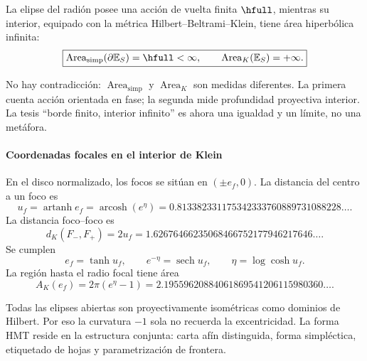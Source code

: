 \begin{theorem}
La elipse del radión posee una acción de vuelta finita \(\hfull\), mientras
su interior, equipado con la métrica Hilbert--Beltrami--Klein, tiene área
hiperbólica infinita:
\begin{equation}
\boxed{
\operatorname{Area}_{\mathrm{simp}}(\partial\mathbb E_S)=\hfull<\infty,
\qquad
\operatorname{Area}_{K}(\mathbb E_S)=+\infty.}
\label{eq:finite-infinite}
\end{equation}
\end{theorem}

No hay contradicción: \(\operatorname{Area}_{\mathrm{simp}}\) y
\(\operatorname{Area}_K\) son medidas diferentes. La primera cuenta acción
orientada en fase; la segunda mide profundidad proyectiva interior. La tesis
\enquote{borde finito, interior infinito} es ahora una igualdad y un límite,
no una metáfora.

\paragraph{Coordenadas focales en el interior de Klein}

En el disco normalizado, los focos se sitúan en \((\pm e_f,0)\). La distancia
del centro a un foco es
\begin{equation}
u_f=\operatorname{artanh}e_f
=\operatorname{arcosh}(e^\eta)
=0.813382331175342333760889731088228\ldots.
\label{eq:klein-focal}
\end{equation}
La distancia foco--foco es
\[
d_K(F_-,F_+)=2u_f
=1.62676466235068466752177946217646\ldots.
\]
Se cumplen
\begin{equation}
e_f=\tanh u_f,\qquad
e^{-\eta}=\operatorname{sech}u_f,\qquad
\eta=\log\cosh u_f.
\label{eq:focal-hyperbolic-chain}
\end{equation}
La región hasta el radio focal tiene área
\[
A_K(e_f)=2\pi(e^\eta-1)
=2.19559620884061869541206115980360\ldots.
\]

Todas las elipses abiertas son proyectivamente isométricas como dominios de
Hilbert. Por eso la curvatura \(-1\) sola no recuerda la excentricidad. La
forma HMT reside en la estructura conjunta: carta afín distinguida, forma
simpléctica, etiquetado de hojas y parametrización de frontera.
